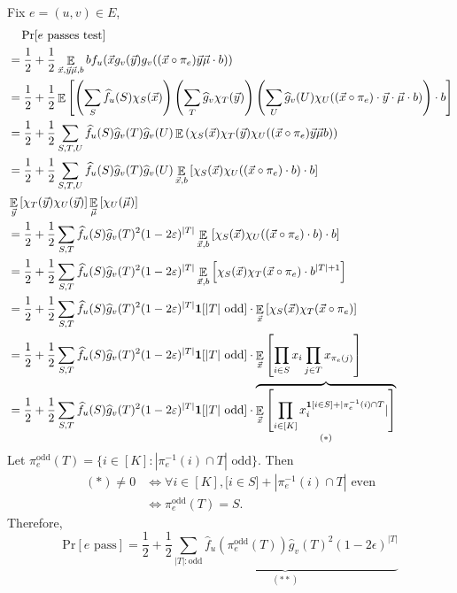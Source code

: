 Fix  $ e=(u,v)\in E $, 
\[\begin{aligned}
    &\quad\,\mathrm{Pr}[e\text{ passes test}]\\
    &=\frac{1}{2}+\frac{1}{2}\mathop\mathbb E_{\vec{x},\vec{y}\vec{\mu},b}bf_u(\vec{x}g_v(\vec{y})g_v((\vec{x}\circ \pi_e)\vec{y}\vec{\mu}\cdot b))\\
    &=\frac12+\frac12\mathop\mathbb E\left[\left(\sum_S\widehat{f}_u(S)\chi_S(\vec{x})\right)\left(\sum_T\widehat{g}_v\chi_T(\vec{y})\right)\left(\sum_U\widehat{g}_v(U)\chi_U((\vec{x}\circ \pi_e)\cdot \vec{y}\cdot \vec\mu\cdot b)\right)\cdot b\right]\\
    &=\frac{1}{2}+\frac12\sum_{S,T,U}\widehat{f}_u(S)\widehat{g}_v(T)\widehat{g}_v(U)\mathop\mathbb E\left(\chi_S(\vec{x})\chi_T(\vec{y})\chi_U((\vec{x}\circ \pi_e)\vec{y}\vec{\mu}b)\right)\\
    &=\frac{1}{2}+\frac{1}{2}\sum_{S,T,U}\widehat{f}_u(S)\widehat{g}_v(T)\widehat{g}_v(U)\mathop\mathbb E_{\vec{x},b}\left[\chi_S(\vec{x})\chi_U((\vec{x}\circ \pi_e)\cdot b)\cdot b\right]\\
    &\mathop\mathbb E_{\vec{y}}\left[\chi_T(\vec{y})\chi_U(\vec{y})\right]\mathop\mathbb E_{\vec{\mu}}\left[\chi_{U}(\vec{\mu})\right]\\
    &=\frac{1}{2}+\frac{1}{2}\sum_{S,T}\widehat{f}_u(S)\widehat{g}_v(T)^2(1-2\varepsilon)^{|T|}\mathop\mathbb E_{\vec{x},b}\left[\chi_S(\vec{x})\chi_U((\vec{x}\circ \pi_e)\cdot b)\cdot b\right]\\
    &=\frac{1}{2}+\frac{1}{2}\sum_{S,T}\widehat{f}_u(S)\widehat{g}_v(T)^2(1-2\varepsilon)^{|T|}\mathop\mathbb E_{\vec{x},b}\left[\chi_S(\vec{x})\chi_T(\vec{x}\circ \pi_e)\cdot b^{|T|+1}\right]\\
    &=\frac{1}{2}+\frac{1}{2}\sum_{S,T}\widehat{f}_u(S)\widehat{g}_v(T)^2(1-2\varepsilon)^{|T|}\mathbf1[|T|\text{ odd}]\cdot \mathop\mathbb E_{\vec{x}}\left[\chi_S(\vec{x})\chi_T(\vec{x}\circ \pi_e)\right]\\
    &=\frac{1}{2}+\frac{1}{2}\sum_{S,T}\widehat{f}_u(S)\widehat{g}_v(T)^2(1-2\varepsilon)^{|T|}\mathbf1[|T|\text{ odd}]\cdot \mathop\mathbb E_{\vec{x}}\left[\prod_{i\in S}x_i\prod_{j\in T}x_{\pi_e(j)}\right]\\
    &=\frac{1}{2}+\frac{1}{2}\sum_{S,T}\widehat{f}_u(S)\widehat{g}_v(T)^2(1-2\varepsilon)^{|T|}\mathbf1[|T|\text{ odd}]\cdot \overbrace{\mathop\mathbb E_{\vec{x}}\left[\prod_{i\in [K]}x_i^{\mathbf1[i\in S]+|\pi_e^{-1}(i)\cap T}|\right]}_{(\ast)}
\end{aligned}\] 
Let  $ \pi_e^{\mathrm{odd}}(T)=\{i\in [K]:|\pi_e^{-1}(i)\cap T|\text{ odd}\} $. Then 
\[\begin{aligned}
    (\ast)\neq 0&\Leftrightarrow \forall i\in [K],\mathbf[i\in S]+|\pi_e^{-1}(i)\cap T|\text{ even}\\
    &\Leftrightarrow  \pi_e^{\text{odd}}(T)=S . 
\end{aligned}\]
Therefore,  
\[\mathrm{Pr}[e\text{ pass}]=\frac{1}{2}+\frac{1}{2}\underbrace{\sum_{|T|:\text{odd}}\hat{f}_u(\pi_e^{\text{odd}}(T))\hat{g}_v(T)^2(1-2\epsilon)^{|T|}}_{(\ast\ast)}\] 

